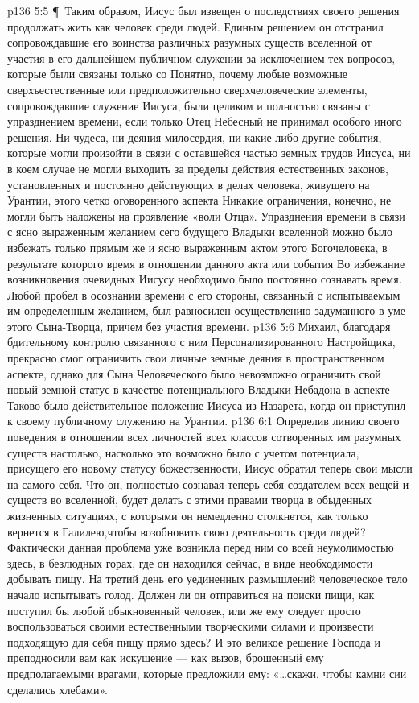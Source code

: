\vs p136 5:5 \P\ Таким образом, Иисус был извещен о последствиях своего решения продолжать жить как человек среди людей. Единым решением он отстранил сопровождавшие его воинства различных разумных существ вселенной от участия в его дальнейшем публичном служении за исключением тех вопросов, которые были связаны только со  Понятно, почему любые возможные сверхъестественные или предположительно сверхчеловеческие элементы, сопровождавшие служение Иисуса, были целиком и полностью связаны с упразднением времени, если только Отец Небесный не принимал особого иного решения. Ни чудеса, ни деяния милосердия, ни какие\hyp{}либо другие события, которые могли произойти в связи с оставшейся частью земных трудов Иисуса, ни в коем случае не могли выходить за пределы действия естественных законов, установленных и постоянно действующих в делах человека, живущего на Урантии,  этого четко оговоренного аспекта  Никакие ограничения, конечно, не могли быть наложены на проявление «воли Отца». Упразднения времени в связи с ясно выраженным желанием сего будущего Владыки вселенной можно было избежать только прямым же и ясно выраженным актом  этого Богочеловека, в результате которого время в отношении данного акта или события  Во избежание возникновения очевидных  Иисусу необходимо было постоянно сознавать время. Любой пробел в осознании времени с его стороны, связанный с испытываемым им определенным желанием, был равносилен осуществлению задуманного в уме этого Сына\hyp{}Творца, причем без участия времени.
\vs p136 5:6 Михаил, благодаря бдительному контролю связанного с ним Персонализированного Настройщика, прекрасно смог ограничить свои личные земные деяния в пространственном аспекте, однако для Сына Человеческого было невозможно ограничить свой новый земной статус в качестве потенциального Владыки Небадона в аспекте  Таково было действительное положение Иисуса из Назарета, когда он приступил к своему публичному служению на Урантии.
\vs p136 6:1 Определив линию своего поведения в отношении всех личностей всех классов сотворенных им разумных существ настолько, насколько это возможно было с учетом потенциала, присущего его новому статусу божественности, Иисус обратил теперь свои мысли на самого себя. Что он, полностью сознавая теперь себя создателем всех вещей и существ во вселенной, будет делать с этими правами творца в обыденных жизненных ситуациях, с которыми он немедленно столкнется, как только вернется в Галилею,чтобы возобновить свою деятельность среди людей? Фактически данная проблема уже возникла перед ним со всей неумолимостью здесь, в безлюдных горах, где он находился сейчас, в виде необходимости добывать пищу. На третий день его уединенных размышлений человеческое тело начало испытывать голод. Должен ли он отправиться на поиски пищи, как поступил бы любой обыкновенный человек, или же ему следует просто воспользоваться своими естественными творческими силами и произвести подходящую для себя пищу прямо здесь? И это великое решение Господа и преподносили вам как искушение --- как вызов, брошенный ему предполагаемыми врагами, которые предложили ему: «\ldots скажи, чтобы камни сии сделались хлебами».
